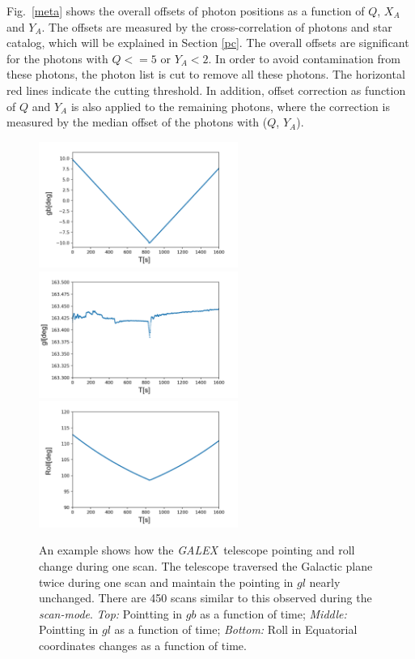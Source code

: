 \documentclass[12pt, preprint]{aastex61}
\newcommand{\project}[1]{\textsl{#1}}
\newcommand{\galex}{\project{GALEX}}
\newcommand{\scanmode}{\project{scan-mode}}
\begin{document}
Fig.~\ref{meta} shows the overall offsets of photon positions as a function of $Q$, $X_A$ and $Y_A$.
The offsets are measured by the cross-correlation of photons and star catalog, which will be explained in Section \ref{pc}.
The overall offsets are significant for the photons with $Q<=5$ or $Y_A<2$.
In order to avoid contamination from these photons, the photon list is cut to remove all these photons.
The horizontal red lines indicate the cutting threshold.
In addition, offset correction as function of $Q$ and $Y_A$ is also applied to the remaining photons, where the correction is measured by the median offset of the photons with ($Q$, $Y_A$).

\begin{figure}[p]
\begin{center}
\includegraphics[width=0.58\textwidth]{figures/01634_0001-gb-new}
\includegraphics[width=0.58\textwidth]{figures/01634_0001-gl-new}
\includegraphics[width=0.58\textwidth]{figures/01634_0001-roll-new}
\end{center}
\caption{%
  \label{telescope}
  An example shows how the \galex\ telescope pointing and roll change during one scan.
  The telescope traversed the Galactic plane twice during one scan and maintain the pointing in $gl$ nearly unchanged.
  There are 450 scans similar to this observed during the \scanmode. 
  \emph{Top:}  Pointting in $gb$ as a function of time;
  \emph{Middle:} Pointting in $gl$ as a function of time;
  \emph{Bottom:} Roll in Equatorial coordinates changes as a function of time.
}
\end{figure}
\end{document}
